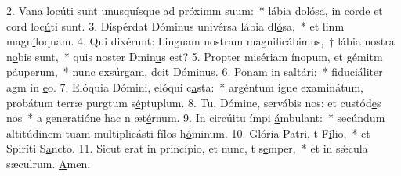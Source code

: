 2. Vana locúti sunt unusquísque ad próximm s\uline{u}um:~* lábia dolósa, in corde et cord loc\uline{ú}ti sunt.
3. Dispérdat Dóminus univérsa lábia dl\uline{ó}sa,~* et linm magn\uline{í}loquam.
4. Qui dixérunt: Linguam nostram magnificábimus,~† lábia nostra  n\uline{o}bis sunt,~* quis noster Dmin\uline{u}s est?
5. Propter misériam ínopum, et gémitm p\uline{áu}perum,~* nunc exsúrgam, dcit D\uline{ó}minus.
6. Ponam in salt\uline{á}ri:~* fiduciáliter agm in \uline{e}o.
7. Elóquia Dómini, elóqui c\uline{a}sta:~* argéntum igne examinátum, probátum terræ purgtum s\uline{é}ptuplum.
8. Tu, Dómine, servábis nos: et custód\uline{e}s nos~* a generatióne hac n æt\uline{é}rnum.
9. In circúitu ímpi \uline{á}mbulant:~* secúndum altitúdinem tuam multiplicásti fílos h\uline{ó}minum.
10. Glória Patri, t F\uline{í}lio,~* et Spiríti S\uline{a}ncto.
11. Sicut erat in princípio, et nunc, t s\uline{e}mper,~* et in sǽcula sæculrum. \uline{A}men.
